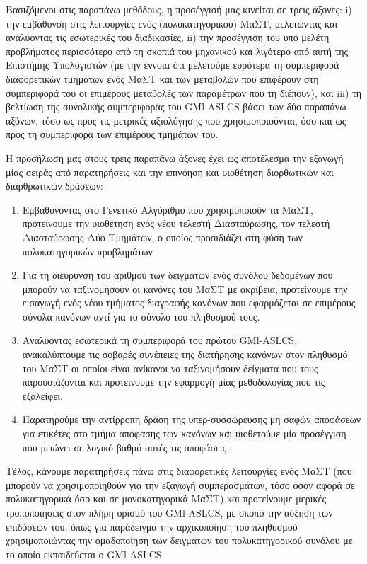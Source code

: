 Βασιζόμενοι στις παραπάνω μεθόδους, η προσέγγισή μας κινείται σε τρεις άξονες: i) την εμβάθυνση στις λειτουργίες ενός (πολυκατηγορικού) ΜαΣΤ, μελετώντας και αναλύοντας τις εσωτερικές του διαδικασίες, ii) την προσέγγιση του υπό μελέτη προβλήματος περισσότερο από τη σκοπιά του μηχανικού και λιγότερο από αυτή της Επιστήμης Υπολογιστών (με την έννοια ότι μελετούμε ευρύτερα τη συμπεριφορά διαφορετικών τμημάτων ενός ΜαΣΤ και των μεταβολών που επιφέρουν στη συμπεριφορά του οι επιμέρους μεταβολές των παραμέτρων που τη διέπουν), και iii) τη βελτίωση της συνολικής συμπεριφοράς του GMl-ASLCS βάσει των δύο παραπάνω αξόνων, τόσο ως προς τις μετρικές αξιολόγησης που χρησιμοποιούνται, όσο και ως προς τη συμπεριφορά των επιμέρους τμημάτων του.

Η προσήλωση μας στους τρεις παραπάνω άξονες έχει ως αποτέλεσμα την εξαγωγή μίας σειράς από παρατηρήσεις και την επινόηση και υιοθέτηση διορθωτικών και διαρθρωτικών δράσεων: 
\begin{enumerate}
\item Εμβαθύνοντας στο Γενετικό Αλγόριθμο που χρησιμοποιούν τα ΜαΣΤ, προτείνουμε την υιοθέτηση ενός νέου τελεστή Διασταύρωσης, τον τελεστή Διασταύρωσης Δύο Τμημάτων, ο οποίος προσιδιάζει στη φύση των πολυκατηγορικών προβλημάτων
\item Για τη διεύρυνση του αριθμού των δειγμάτων ενός συνόλου δεδομένων που μπορούν να ταξινομήσουν οι κανόνες του ΜαΣΤ με ακρίβεια, προτείνουμε την εισαγωγή ενός νέου τμήματος διαγραφής κανόνων που εφαρμόζεται σε επιμέρους σύνολα κανόνων αντί για το σύνολο του πληθυσμού τους.
\item Αναλύοντας εσωτερικά τη συμπεριφορά του πρώτου GMl-ASLCS, ανακαλύπτουμε τις σοβαρές συνέπειες της διατήρησης κανόνων στον πληθυσμό του ΜαΣΤ οι οποίοι είναι ανίκανοι να ταξινομήσουν δείγματα που τους παρουσιάζονται και προτείνουμε την εφαρμογή μίας μεθοδολογίας που τις εξαλείφει.
\item Παρατηρούμε την αντίρροπη δράση της υπερ-συσσώρευσης μη σαφών αποφάσεων για ετικέτες στο τμήμα απόφασης των κανόνων και υιοθετούμε μία προσέγγιση που μειώνει σε λογικό βαθμό αυτές τις αποφάσεις. 
\end{enumerate}

Τέλος, κάνουμε παρατηρήσεις πάνω στις διαφορετικές λειτουργίες ενός ΜαΣΤ (που μπορούν να χρησιμοποιηθούν για την εξαγωγή συμπερασμάτων, τόσο όσον αφορά σε πολυκατηγορικά όσο και σε μονοκατηγορικά ΜαΣΤ) και προτείνουμε μερικές τροποποιήσεις στον πλήρη ορισμό του GMl-ASLCS, με σκοπό την αύξηση των επιδόσεών του, όπως για παράδειγμα την αρχικοποίηση του πληθυσμού χρησιμοποιώντας την ομαδοποίηση των δειγμάτων του πολυκατηγορικού συνόλου με το οποίο εκπαιδεύεται ο GMl-ASLCS.


